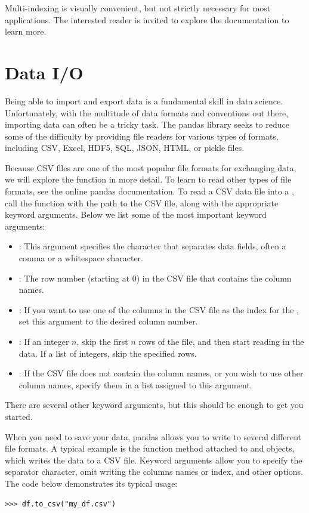 Multi-indexing is visually convenient, but not strictly necessary for most applications.
The interested reader is invited to explore the documentation to learn more.

\section*{Data I/O}
Being able to import and export data is a fundamental skill in data science. Unfortunately, with the
multitude of data formats and conventions out there, importing data can often be a tricky task. The pandas library
seeks to reduce some of the difficulty by providing file readers for various types of formats, including
CSV, Excel, HDF5, SQL, JSON, HTML, or pickle files.

Because CSV files are one of the most popular file formats for exchanging data, we will explore the
 function in more detail. To learn to read other types of file formats, see the online pandas documentation.
To read a CSV data file into a , call the  function with the path to the CSV file,
along with the appropriate keyword arguments. Below we list some of the most important keyword arguments:
\begin{itemize}
\item {}:
This argument specifies the character that separates data fields, often a comma or a whitespace character.

\item {}:
The row number (starting at 0) in the CSV file that contains the column names.

\item {}:
If you want to use one of the columns in the CSV file as the index for the ,
set this argument to the desired column number.

\item {}:
If an integer $n$, skip the first $n$ rows of the file, and then start reading in the data. If a list
of integers, skip the specified rows.

\item {}:
If the CSV file does not contain the column names, or you wish to use other column names, specify them
in a list assigned to this argument.

\end{itemize}
There are several other keyword arguments, but this should be enough to get you started.

When you need to save your data, pandas allows you to write to several different file formats.
A typical example is the  function method attached to  and  objects,
which writes the data to a CSV file.
Keyword arguments allow you to specify the separator character, omit writing the columns names or index,
and other options. The code below demonstrates its typical usage:
\begin{lstlisting}
>>> df.to_csv("my_df.csv")
\end{lstlisting}

